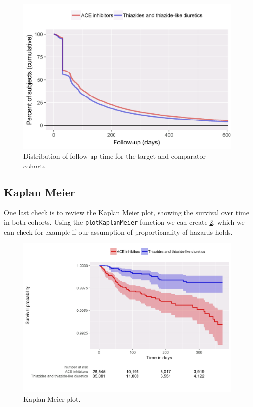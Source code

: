 \documentclass[11pt]{book}
\begin{document}
\begin{figure}

{\centering \includegraphics[width=0.8\linewidth]{images/PopulationLevelEstimation/followUp} 

}

\caption{Distribution of follow-up time for the target and comparator cohorts.}\label{fig:followUp}
\end{figure}

\subsection{Kaplan Meier}\label{kaplan-meier}

One last check is to review the Kaplan Meier plot, showing the survival
over time in both cohorts. Using the \texttt{plotKaplanMeier} function
we can create \ref{fig:kmPlot}, which we can check for example if our
assumption of proportionality of hazards holds.

\begin{figure}

{\centering \includegraphics[width=1\linewidth]{images/PopulationLevelEstimation/kmPlot} 

}

\caption{Kaplan Meier plot.}\label{fig:kmPlot}
\end{figure}
\end{document}
